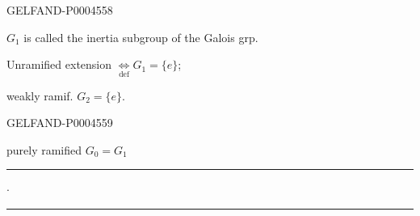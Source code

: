\begin{GelfandAdjacentEvidence}{GELFAND-P000455}{8}


$G_1$ is called the inertia subgroup of the Galois grp.

Unramified extension $\underset{\mathrm{def}}{\Longleftrightarrow} G_1=\{e\}$;

weakly ramif. $G_2=\{e\}$.
\end{GelfandAdjacentEvidence}
\begin{GelfandAdjacentEvidence}{GELFAND-P000455}{9}


purely ramified $G_0=G_1$
\end{GelfandAdjacentEvidence}


\begin{center}
\rule[.5ex]{25mm}{.35pt}\enspace$\cdot$\enspace\rule[.5ex]{35mm}{.35pt}
\end{center}


